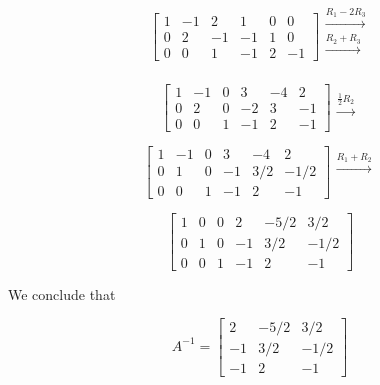\documentclass{ximera}
\begin{document}
\begin{example}
\begin{explanation}
 $$\left[\begin{array}{ccc|ccc}  
 1&-1&2&1&0&0\\0&2&-1&-1&1&0\\0&0&1&-1&2&-1
 \end{array}\right]
 \begin{array}{c}
 \xrightarrow{R_1-2R_3}\\
 \xrightarrow{R_2+R_3}\\
\\
 \end{array}$$
 
 $$\left[\begin{array}{ccc|ccc}  
 1&-1&0&3&-4&2\\0&2&0&-2&3&-1\\0&0&1&-1&2&-1
 \end{array}\right]
  \begin{array}{c}
 \\
 \xrightarrow{\frac{1}{2}R_2}\\
\\
 \end{array}$$
 
 $$\left[\begin{array}{ccc|ccc}  
 1&-1&0&3&-4&2\\0&1&0&-1&3/2&-1/2\\0&0&1&-1&2&-1
 \end{array}\right]
 \begin{array}{c}
 \xrightarrow{R_1+R_2}\\
 \\
\\
 \end{array}$$
 
 $$\left[\begin{array}{ccc|ccc}  
 1&0&0&2&-5/2&3/2\\0&1&0&-1&3/2&-1/2\\0&0&1&-1&2&-1
 \end{array}\right]$$
 
 We conclude that
 
$$A^{-1}=\begin{bmatrix}2&-5/2&3/2\\-1&3/2&-1/2\\-1&2&-1\end{bmatrix}$$
\end{explanation}

\end{example}
\end{document}
